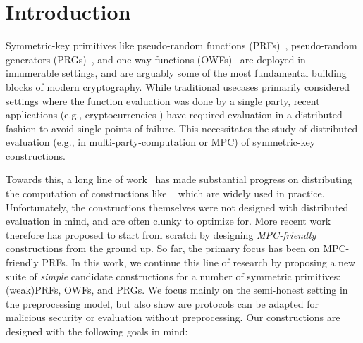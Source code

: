 
\section{Introduction}
\label{sec:introduction}



\medskip

Symmetric-key primitives like pseudo-random functions (PRFs)~\cite{goldreich1984-prf}, pseudo-random generators (PRGs)~\cite{?}, and one-way-functions (OWFs)~\cite{?} are deployed in innumerable settings, and are arguably some of the most fundamental building blocks of modern cryptography. While traditional usecases primarily considered settings where the function evaluation was done by a single party, recent applications (e.g., cryptocurrencies ) have required evaluation in a distributed fashion to avoid single points of failure. This necessitates the study of distributed evaluation (e.g., in multi-party-computation or MPC) of symmetric-key constructions. 

Towards this, a long line of work~\cite{?} has made substantial progress on distributing the computation of constructions like ~\cite{?} which are widely used in practice. Unfortunately, the constructions themselves were not designed with distributed evaluation in mind, and are often clunky to optimize for. More recent work~\cite{grassi2016-mpcfriendly, boneh2018-darkmatter} therefore has proposed to start from scratch by designing \textit{MPC-friendly} constructions from the ground up. So far, the primary focus has been on MPC-friendly PRFs. In this work, we continue this line of research by proposing a new suite of \textit{simple} candidate constructions for a number of symmetric primitives: (weak)PRFs, OWFs, and PRGs. We focus mainly on the semi-honest setting in the preprocessing model, but also show are protocols can be adapted for malicious security or evaluation without preprocessing. Our constructions are designed with the following goals in mind:

